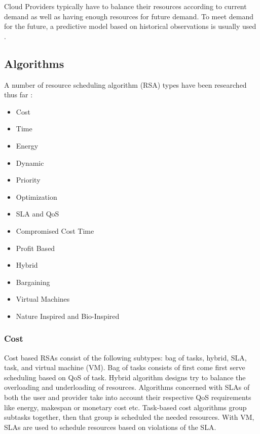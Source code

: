 \documentclass[12pt]{article}
\begin{document}

Cloud Providers typically have to balance their resources according to current demand as well as having enough resources for future demand. To meet demand for the future, a predictive model based on historical observations is usually used \cite{Jennings2015}.

\subsection{Algorithms} \label{sub:schedalgorithms}

A number of resource scheduling algorithm (RSA) types have been researched thus far \cite{Singh2016}:
\begin{itemize}
    \item Cost
    \item Time
    \item Energy
    \item Dynamic
    \item Priority
    \item Optimization
    \item SLA and QoS
    \item Compromised Cost Time
    \item Profit Based
    \item Hybrid
    \item Bargaining
    \item Virtual Machines
    \item Nature Inspired and Bio-Inspired
\end{itemize}



\subsubsection{Cost} \label{ssub:algCost}

Cost based RSAs consist of the following subtypes: bag of tasks, hybrid, SLA, task, and virtual machine (VM).
Bag of tasks consists of first come first serve scheduling based on QoS of task.
Hybrid algorithm designs try to balance the overloading and underloading of resources.
Algorithms concerned with SLAs of both the user and provider take into account their respective QoS requirements like energy, makespan or monetary cost etc.
Task-based cost algorithms group subtasks together, then that group is scheduled the needed resources.
With VM, SLAs are used to schedule resources based on violations of the SLA.
\end{document}
